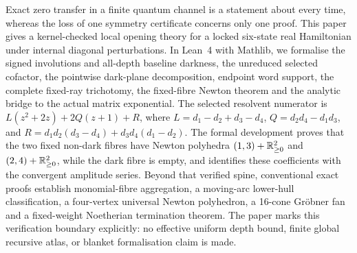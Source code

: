 Exact zero transfer in a finite quantum channel is a statement about every
time, whereas the loss of one symmetry certificate concerns only one proof.
This paper gives a kernel-checked local opening theory for a locked six-state
real Hamiltonian under internal diagonal perturbations.  In Lean~4 with
Mathlib, we formalise the signed involutions and all-depth baseline darkness,
the unreduced selected cofactor, the pointwise dark-plane decomposition,
endpoint word support, the complete fixed-ray trichotomy, the fixed-fibre
Newton theorem and the analytic bridge to the actual matrix exponential.  The
selected resolvent numerator is
\(
L(z^2+2z)+2Q(z+1)+R
\), where
\(L=d_1-d_2+d_3-d_4\), \(Q=d_2d_4-d_1d_3\), and
\(R=d_1d_2(d_3-d_4)+d_3d_4(d_1-d_2)\).
The formal development proves that the two fixed non-dark fibres have Newton
polyhedra \((1,3)+\mathbb R_{\ge0}^2\) and \((2,4)+\mathbb R_{\ge0}^2\), while the dark fibre
is empty, and identifies these coefficients with the convergent amplitude
series.  Beyond that verified spine, conventional exact proofs establish
monomial-fibre aggregation, a moving-arc lower-hull classification, a
four-vertex universal Newton polyhedron, a 16-cone Gr\"obner fan and a
fixed-weight Noetherian termination theorem.  The paper marks this verification
boundary explicitly: no effective uniform depth bound, finite global recursive
atlas, or blanket formalisation claim is made.
